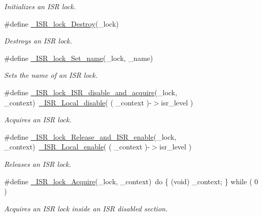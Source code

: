 \begin{DoxyCompactItemize}
\begin{DoxyCompactList}\small\item\em Initializes an I\+SR lock. \end{DoxyCompactList}\item 
\#define \mbox{\hyperlink{group__RTEMSScoreISRLocks_ga918784c3c13a2fb3a27173cbc471285a}{\+\_\+\+I\+S\+R\+\_\+lock\+\_\+\+Destroy}}(\+\_\+lock)
\begin{DoxyCompactList}\small\item\em Destroys an I\+SR lock. \end{DoxyCompactList}\item 
\#define \mbox{\hyperlink{group__RTEMSScoreISRLocks_ga50c13faa89292b96a4bcf5ef34d76fac}{\+\_\+\+I\+S\+R\+\_\+lock\+\_\+\+Set\+\_\+name}}(\+\_\+lock,  \+\_\+name)
\begin{DoxyCompactList}\small\item\em Sets the name of an I\+SR lock. \end{DoxyCompactList}\item 
\#define \mbox{\hyperlink{group__RTEMSScoreISRLocks_gaa4ecfcd40e90531bdd3c348a99b3b7d9}{\+\_\+\+I\+S\+R\+\_\+lock\+\_\+\+I\+S\+R\+\_\+disable\+\_\+and\+\_\+acquire}}(\+\_\+lock,  \+\_\+context)~\mbox{\hyperlink{group__RTEMSScoreISR_ga2a829f51f98576aa596562985e1df2fc}{\+\_\+\+I\+S\+R\+\_\+\+Local\+\_\+disable}}( ( \+\_\+context )-\/$>$isr\+\_\+level )
\begin{DoxyCompactList}\small\item\em Acquires an I\+SR lock. \end{DoxyCompactList}\item 
\#define \mbox{\hyperlink{group__RTEMSScoreISRLocks_ga87a2125e8bfba5f2f5b72adbeee4dcc3}{\+\_\+\+I\+S\+R\+\_\+lock\+\_\+\+Release\+\_\+and\+\_\+\+I\+S\+R\+\_\+enable}}(\+\_\+lock,  \+\_\+context)~\mbox{\hyperlink{group__RTEMSScoreISR_ga508f5a32655cb590906a477b5a8174f1}{\+\_\+\+I\+S\+R\+\_\+\+Local\+\_\+enable}}( ( \+\_\+context )-\/$>$isr\+\_\+level )
\begin{DoxyCompactList}\small\item\em Releases an I\+SR lock. \end{DoxyCompactList}\item 
\#define \mbox{\hyperlink{group__RTEMSScoreISRLocks_ga69700d5284dea5b4ce06b5ebc405d797}{\+\_\+\+I\+S\+R\+\_\+lock\+\_\+\+Acquire}}(\+\_\+lock,  \+\_\+context)~do \{ (void) \+\_\+context; \} while ( 0 )
\begin{DoxyCompactList}\small\item\em Acquires an I\+SR lock inside an I\+SR disabled section. \end{DoxyCompactList}\item 

\end{DoxyCompactItemize}
